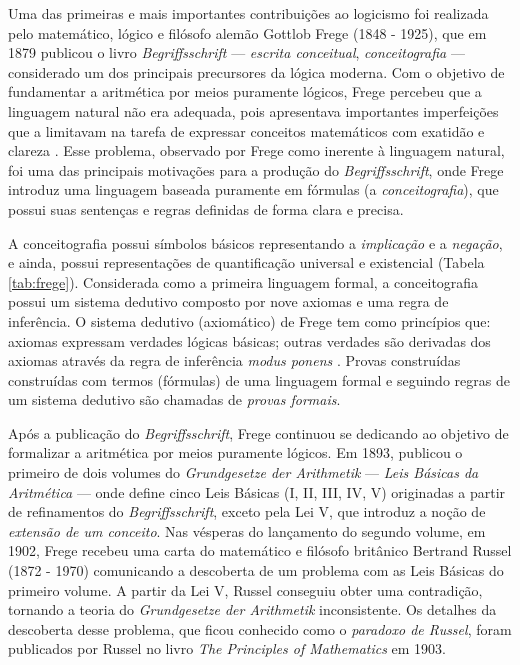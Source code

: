Uma das primeiras e mais importantes contribuições ao logicismo foi realizada pelo matemático, lógico e filósofo alemão Gottlob Frege (1848 - 1925), que em 1879 publicou o livro \textit{Begriffsschrift} --- \textit{escrita conceitual}, \textit{conceitografia} --- considerado um dos principais precursores da lógica moderna. Com o objetivo de fundamentar a aritmética por meios puramente lógicos, Frege percebeu que a linguagem natural não era adequada, pois apresentava importantes imperfeições que a limitavam na tarefa de expressar conceitos matemáticos com exatidão e clareza \cite{Frege2018}. Esse problema, observado por Frege como inerente à linguagem natural, foi uma das principais motivações para a produção do \textit{Begriffsschrift}, onde Frege introduz uma linguagem baseada puramente em fórmulas (a \textit{conceitografia}), que possui suas sentenças e regras definidas de forma clara e precisa.

A conceitografia possui símbolos básicos representando a \textit{implicação} e a \textit{negação}, e ainda, possui representações de quantificação universal e existencial (Tabela \ref{tab:frege}). Considerada como a primeira linguagem formal, a conceitografia possui um sistema dedutivo composto por nove axiomas e uma regra de inferência. O sistema dedutivo (axiomático) de Frege tem como princípios que: axiomas expressam verdades lógicas básicas; outras verdades são derivadas dos axiomas através da regra de inferência \textit{modus ponens} \cite{SEP-ProofTheory}. Provas construídas construídas com termos (fórmulas) de uma linguagem formal e seguindo regras de um sistema dedutivo são chamadas de \textit{provas formais}.



Após a publicação do \textit{Begriffsschrift}, Frege continuou se dedicando ao objetivo de formalizar a aritmética por meios puramente lógicos. Em 1893, publicou o primeiro de dois volumes do \textit{Grundgesetze der Arithmetik} --- \textit{Leis Básicas da Aritmética} --- onde define cinco Leis Básicas (I, II, III, IV, V) originadas a partir de refinamentos do \textit{Begriffsschrift}, exceto pela Lei V, que introduz a noção de \textit{extensão de um conceito}. Nas vésperas do lançamento do segundo volume, em 1902, Frege recebeu uma carta do matemático e filósofo britânico Bertrand  Russel (1872 - 1970) comunicando a descoberta de um problema com as Leis Básicas do primeiro volume. A partir da Lei V, Russel conseguiu obter uma contradição, tornando a teoria do \textit{Grundgesetze der Arithmetik} inconsistente. Os detalhes da descoberta desse problema, que ficou conhecido como o \textit{paradoxo de Russel}, foram publicados por Russel no livro \textit{The Principles of Mathematics} em 1903.

